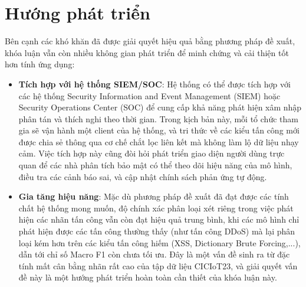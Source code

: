 \section{Hướng phát triển}

Bên cạnh các khó khăn đã được giải quyết hiệu quả bằng phương pháp đề xuất, khóa luận vẫn còn nhiều không gian phát triển để minh chứng và cải thiện tốt hơn tính ứng dụng:

\begin{itemize}
    
    \item \textbf{Tích hợp với hệ thống SIEM/SOC}: Hệ thống có thể được tích hợp với các hệ thống Security Information and Event Management (SIEM) hoặc Security Operations Center (SOC) để cung cấp khả năng phát hiện xâm nhập phân tán và thích nghi theo thời gian. Trong kịch bản này, mỗi tổ chức tham gia sẽ vận hành một client của hệ thống, và tri thức về các kiểu tấn công mới được chia sẻ thông qua cơ chế chắt lọc liên kết mà không làm lộ dữ liệu nhạy cảm. Việc tích hợp này cũng đòi hỏi phát triển giao diện người dùng trực quan để các nhà phân tích bảo mật có thể theo dõi hiệu năng của mô hình, điều tra các cảnh báo sai, và cập nhật chính sách phản ứng tự động.
    
    
    \item \textbf{Gia tăng hiệu năng}: Mặc dù phương pháp đề xuất đã đạt được các tính chất hệ thống mong muốn, độ chính xác phân loại xét riêng trong việc phát hiện các nhãn tấn công vẫn còn đạt hiệu quả trung bình, khi các mô hình chỉ phát hiện được các tấn công thường thấy (như tấn công DDoS) mà lại phân loại kém hơn trên các kiểu tấn công hiếm (XSS, Dictionary Brute Forcing,...), dẫn tới chỉ số Macro F1 còn chưa tối ưu. Đây là một vấn đề sinh ra từ đặc tính mất cân bằng nhãn rất cao của tập dữ liệu CICIoT23, và giải quyết vấn đề này là một hướng phát triển hoàn toàn cần thiết của khóa luận này.
    

\end{itemize}
